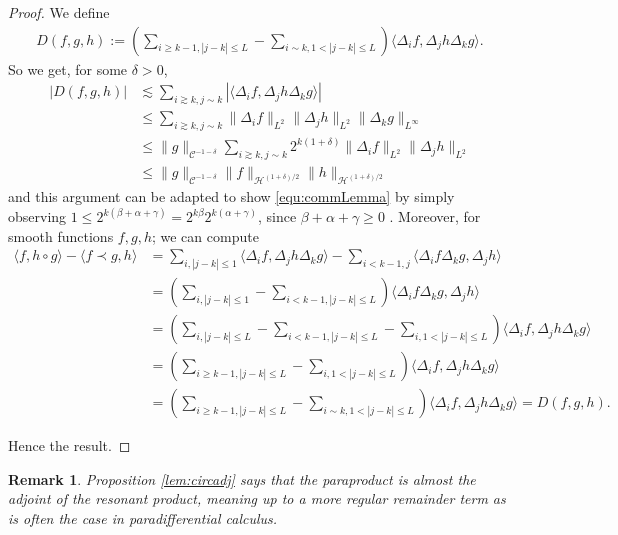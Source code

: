 \documentclass[11pt, oneside]{article}   	%
\newcommand{\tmem}[1]{{\em #1\/}}
\newtheorem{remark}[theorem]{Remark}
\newcommand{\CC}{\mathscr{C}}
\newcommand{\ssp}{\mathscr{H}}
\begin{document}
\begin{proof}
	We define
	\begin{align*}	
	D (f, g, h) := \left( \sum_{i \ge k - 1, | j - k | \le L} - \sum_{i \sim
		k, 1 < | j - k | \le L} \right) \langle \Delta_i f, \Delta_j h
	\Delta_k g \rangle.
	\end{align*}
	So we get, for some $\delta>0$,
	\begin{align*}
	| D (f, g, h) | &\lesssim \sum_{i \gtrsim k, j \sim k} | \langle \Delta_i
	f, \Delta_j h \Delta_k g \rangle |\\& \le \sum_{i \gtrsim k, j \sim k}
	\| \Delta_i f \|_{L^2} \| \Delta_j h \|_{L^2} \| \Delta_k g
	\|_{L^{\infty}} 
	\\&\le \| g \|_{\CC^{- 1 - \delta}} \sum_{i \gtrsim k, j \sim k} 2^{k (1
		+ \delta)} \| \Delta_i f \|_{L^2} \| \Delta_j h \|_{L^2} \\&\le \| g
	\|_{\CC^{- 1 - \delta}} \| f \|_{\ssp^{(1 + \delta) / 2}} \| h
	\|_{\ssp^{(1 + \delta) / 2}}
	\end{align*} 
	and this argument can be adapted to show \eqref{equ:commLemma} by simply observing $1 \leq 2^{k(\beta+ \alpha+ \gamma)}  = 2^{k\beta}2^{k ( \alpha+ \gamma)} $, since $\beta+ \alpha+ \gamma \geq 0$  .
	Moreover, for smooth functions $f,g,h $; we can compute
	\begin{align*}	
	\langle f, h \circ g \rangle - \langle f \prec g, h
	\rangle &= \sum_{i, | j - k | \le 1} \langle \Delta_i f,
	\Delta_j h \Delta_k g \rangle - \sum_{i < k - 1, j} \langle \Delta_i f
	\Delta_k g, \Delta_j h \rangle 
	\\ &= \left( \sum_{i, | j - k | \le 1} - \sum_{i < k - 1, | j - k |
		\le L} \right) \langle \Delta_i f \Delta_k g, \Delta_j h \rangle 
	\\&= \left( \sum_{i, | j - k | \le L} - \sum_{i < k - 1, | j - k |
		\le L} - \sum_{i, 1 < | j - k | \le L} \right) \langle
	\Delta_i f, \Delta_j h \Delta_k g \rangle 
	\\&= \left( \sum_{i \ge k - 1, | j - k | \le L} - \sum_{i, 1 < |
		j - k | \le L} \right) \langle \Delta_i f, \Delta_j h \Delta_k g
	\rangle 
	\\&= \left( \sum_{i \ge k - 1, | j - k | \le L} - \sum_{i \sim
		k, 1 < | j - k | \le L} \right) \langle \Delta_i f, \Delta_j h
	\Delta_k g \rangle = D (f, g, h).
	\end{align*}
	
	Hence the result.
\end{proof}

\begin{remark}\upshape\upshape
	Proposition \ref{lem:circadj} says that  the paraproduct is {\tmem{almost
		}}the adjoint of the resonant product, meaning up to a more regular
		remainder term as is often the case in paradifferential calculus.
	\end{remark}
	
\end{document}
